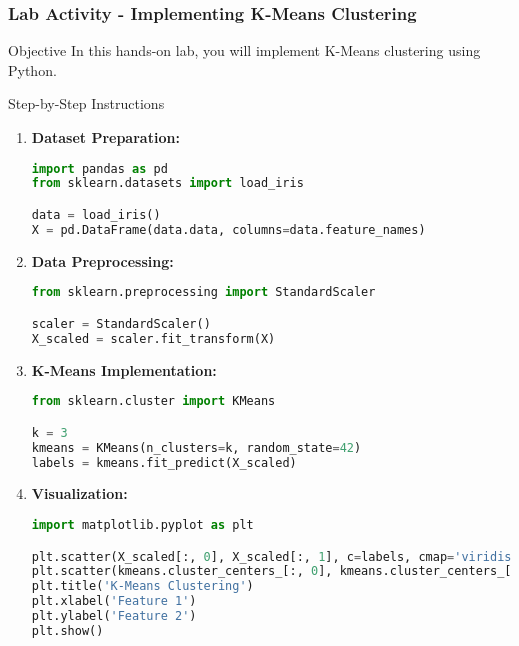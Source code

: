 \documentclass[aspectratio=169]{beamer}
\begin{document}
\begin{frame}[fragile]
    \frametitle{Lab Activity - Implementing K-Means Clustering}
    \begin{block}{Objective}
        In this hands-on lab, you will implement K-Means clustering using Python.
    \end{block}

    \begin{block}{Step-by-Step Instructions}
        \begin{enumerate}
            \item \textbf{Dataset Preparation:}
            \begin{lstlisting}[language=Python]
import pandas as pd
from sklearn.datasets import load_iris

data = load_iris()
X = pd.DataFrame(data.data, columns=data.feature_names)
            \end{lstlisting}

            \item \textbf{Data Preprocessing:}
            \begin{lstlisting}[language=Python]
from sklearn.preprocessing import StandardScaler

scaler = StandardScaler()
X_scaled = scaler.fit_transform(X)
            \end{lstlisting}

            \item \textbf{K-Means Implementation:}
            \begin{lstlisting}[language=Python]
from sklearn.cluster import KMeans

k = 3
kmeans = KMeans(n_clusters=k, random_state=42)
labels = kmeans.fit_predict(X_scaled)
            \end{lstlisting}

            \item \textbf{Visualization:}
            \begin{lstlisting}[language=Python]
import matplotlib.pyplot as plt

plt.scatter(X_scaled[:, 0], X_scaled[:, 1], c=labels, cmap='viridis')
plt.scatter(kmeans.cluster_centers_[:, 0], kmeans.cluster_centers_[:, 1], color='red', marker='x')
plt.title('K-Means Clustering')
plt.xlabel('Feature 1')
plt.ylabel('Feature 2')
plt.show()
            \end{lstlisting}
        \end{enumerate}
    \end{block}
\end{frame}
\end{document}
